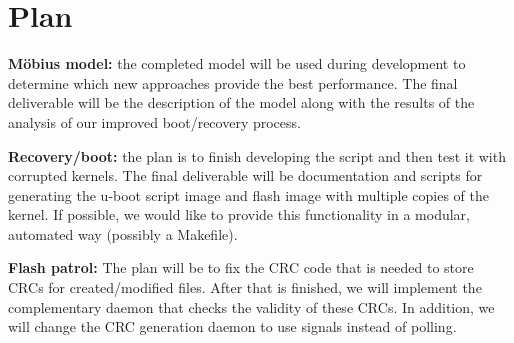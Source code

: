 \section{Plan}

\textbf{M\"obius model:} the completed model will be used during development to
determine which new approaches provide the best performance.  The final
deliverable will be the description of the model along with the results of the
analysis of our improved boot/recovery process.

\textbf{Recovery/boot:} the plan is to finish developing the script and then
test it with corrupted kernels.  The final deliverable will be documentation and
scripts for generating the u-boot script image and flash image with multiple
copies of the kernel.  If possible, we would like to provide this functionality
in a modular, automated way (possibly a Makefile).

\textbf{Flash patrol:} The plan will be to fix the CRC code that is needed to
store CRCs for created/modified files.  After that is finished, we will
implement the complementary daemon that checks the validity of these CRCs. In
addition, we will change the CRC generation daemon to use signals instead of
polling.
